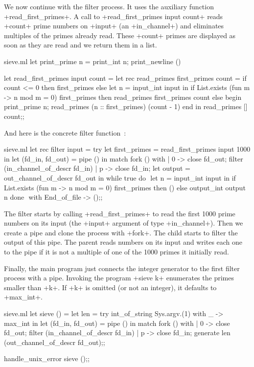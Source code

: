 We now continue with the filter process. It uses the auxiliary function
\ml+read_first_primes+. A call to \ml+read_first_primes input count+ 
reads \ml+count+ prime numbers on \ml+input+ (an \ml+in_channel+) and eliminates
multiples of the primes already read. These \ml+count+ primes are
displayed as soon as they are read and we return them in a list.
%
\begin{listingcodefile}[style=numbers]{sieve.ml}
let print_prime n = print_int n; print_newline ()

let read_first_primes input count =
  let rec read_primes first_primes count =
    if count <= 0 then first_primes else
    let n = input_int input in
    if List.exists (fun m -> n mod m = 0) first_primes then
      read_primes first_primes count
    else begin
      print_prime n;
      read_primes (n :: first_primes) (count - 1)
    end 
  in
  read_primes [] count$\label{prog:pprime}$;;
\end{listingcodefile}
%
And here is the concrete filter function~:  
%
\begin{listingcodefile}[style=numbers]{sieve.ml}
let rec filter input =
  try 
    let first_primes = read_first_primes input 1000 in
    let (fd_in, fd_out) = pipe () in
    match fork () with
    | 0 ->
        close fd_out;
        filter (in_channel_of_descr fd_in)
    | p ->
        close fd_in;
        let output = out_channel_of_descr fd_out in
        while true do $\label{prog:sievewhile}$
          let n = input_int input in
          if List.exists (fun m -> n mod m = 0) first_primes then ()
          else output_int output n
        done $\label{prog:sievedone}$
  with End_of_file -> ();;
\end{listingcodefile}
%
The filter starts by calling \ml+read_first_primes+ to read the first
1000 prime numbers on its input (the \ml+input+ argument of type
\ml+in_channel+). Then we create a pipe and clone the process with
\ml+fork+. The child starts to filter the output of this pipe.  The
parent reads numbers on its input and writes each one to the pipe if it
is not a multiple of one of the 1000 primes it initially read.

Finally, the main program just connects the integer generator to the
first filter process with a pipe. Invoking the program \ml+sieve k+
enumerates the primes smaller than \ml+k+. If \ml+k+ is omitted (or
not an integer), it defaults to \ml+max_int+.
%
\begin{listingcodefile}[style=numbers]{sieve.ml}
let sieve () =
  let len = try int_of_string Sys.argv.(1) with _ -> max_int in
  let (fd_in, fd_out) = pipe () in
  match fork () with
  | 0 ->
      close fd_out;
      filter (in_channel_of_descr fd_in)
  | p ->
      close fd_in;
      generate len (out_channel_of_descr fd_out);; $\label{prog:gen}$

handle_unix_error sieve ();;
\end{listingcodefile}
%

